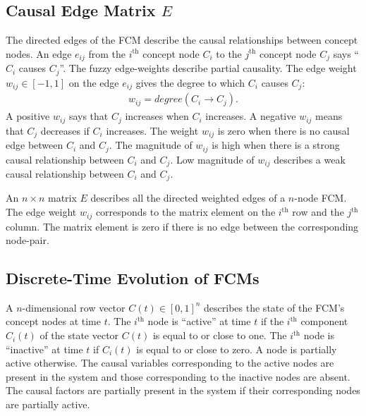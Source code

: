 \documentclass[runningheads]{llncs}
\begin{document}
\begin{figure}[ht]

\end{figure}













\subsection{Causal Edge Matrix $E$}
The directed edges of the FCM describe the causal relationships between concept nodes. 
An edge $e_{ij}$ from the $i^{\text{th}}$ concept node $C_i$ to the $j^{\text{th}}$ concept node $C_j$ says ``$C_i$ causes $C_j$''. 
The fuzzy edge-weights describe partial causality. 
The edge weight $w_{ij} \in [-1,1]$ on the edge $e_{ij}$ gives the degree to which $C_i$ causes $C_j$:
\begin{align}
    w_{ij} = degree(C_i \rightarrow C_j).
\end{align}
A positive $w_{ij}$ says that $C_j$ increases when $C_i$ increases. 
A negative $w_{ij}$ means that $C_j$ decreases if $C_i$ increases. 
The weight $w_{ij}$ is zero when there is no causal edge between $C_i$ and $C_j$. 
The magnitude of $w_{ij}$ is high when there is a strong causal relationship between $C_i$ and $C_j$. 
Low magnitude of $w_{ij}$ describes a weak causal relationship between $C_i$ and $C_j$. 


An $n \times n$ matrix $E$ describes all the directed weighted edges of a $n$-node FCM. 
The edge weight $w_{ij}$ corresponds to the matrix element on the $i^{\text{th}}$ row and the $j^{\text{th}}$ column. 
The matrix element is zero if there is no edge between the corresponding node-pair. 




\subsection{Discrete-Time Evolution of FCMs}

A $n$-dimensional row vector $C(t) \in [0,1]^n$ describes the state of the FCM's concept nodes at time $t$. 
The $i^{\text{th}}$ node is ``active'' at time $t$ if the $i^{\text{th}}$ component $C_i(t)$ of the state vector $C(t)$ is equal to or close to one. 
The $i^{\text{th}}$ node is ``inactive'' at time $t$ if $C_i(t)$ is equal to or close to zero. 
A node is partially active otherwise. 
The causal variables corresponding to the active nodes are present in the system and those corresponding to the inactive nodes are absent. 
The causal factors are partially present in the system if their corresponding nodes are partially active. 
\end{document}
